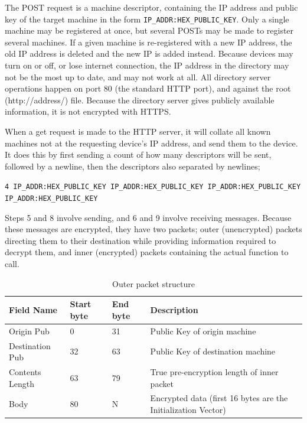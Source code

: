 \documentclass{article}
\begin{document}
The POST request is a machine descriptor, containing the IP address and public key of the target machine in the form \texttt{IP\_ADDR:HEX\_PUBLIC\_KEY}. Only a single machine may be registered at once, but several POSTs may be made to register several machines. If a given machine is re-registered with a new IP address, the old IP address is deleted and the new IP is added instead. Because devices may turn on or off, or lose internet connection, the IP address in the directory may not be the most up to date, and may not work at all. All directory server operations happen on port 80 (the standard HTTP port), and against the root (http://address/) file. Because the directory server gives publicly available information, it is not encrypted with HTTPS.

When a get request is made to the HTTP server, it will collate all known machines not at the requesting device's IP address, and send them to the device. It does this by first sending a count of how many descriptors will be sent, followed by a newline, then the descriptors also separated by newlines;

\texttt{4 \newline
IP\_ADDR:HEX\_PUBLIC\_KEY \newline
IP\_ADDR:HEX\_PUBLIC\_KEY \newline
IP\_ADDR:HEX\_PUBLIC\_KEY \newline
IP\_ADDR:HEX\_PUBLIC\_KEY
}

Steps 5 and 8 involve sending, and 6 and 9 involve receiving messages. Because these messages are encrypted, they have two packets; outer (unencrypted) packets directing them to their destination while providing information required to decrypt them, and inner (encrypted) packets containing the actual function to call.

\begin{table}[H]
\begin{tabular}{|p{25mm}|l|l|p{45mm}|}
\hline
\textbf{Field Name}	& \textbf{Start byte}	& \textbf{End byte}		& \textbf{Description} \\ \hline
Origin Pub					& 0									& 31							& Public Key of origin machine \\ \hline
Destination Pub			& 32								& 63							& Public Key of destination machine \\ \hline
Contents Length			& 63								& 79							& True pre-encryption length of inner packet \\ \hline
Body								& 80								& N								& Encrypted data (first 16 bytes are the Initialization Vector) \\ \hline
\end{tabular}
\caption{Outer packet structure}
\end{table}
\end{document}
